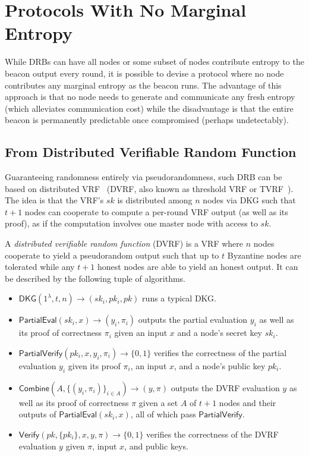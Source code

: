 \section{Protocols With No Marginal Entropy}
\label{section:dvrf}
While DRBs can have all nodes or some subset of nodes contribute entropy to the beacon output every round, it is possible to devise a protocol where no node contributes any marginal entropy as the beacon runs. The advantage of this approach is that no node needs to generate and communicate any fresh entropy (which alleviates communication cost) while the disadvantage is that the entire beacon is permanently predictable once compromised (perhaps undetectably).

\subsection{From Distributed Verifiable Random Function}
Guaranteeing randomness entirely via pseudorandomness, such DRB can be based on distributed VRF~\cite{hanke2018dfinity,galindo2020fully} (DVRF, also known as threshold VRF or TVRF~\cite{cascudomt}). The idea is that the VRF's $sk$ is distributed among $n$ nodes via DKG such that $t + 1$ nodes can cooperate to compute a per-round VRF output (as well as its proof), as if the computation involves one master node with access to $sk$.

\begin{definition}
A \textit{distributed verifiable random function} (DVRF) is a VRF where $n$ nodes cooperate to yield a pseudorandom output such that up to $t$ Byzantine nodes are tolerated while any $t + 1$ honest nodes are able to yield an honest output. It can be described by the following tuple of algorithms.
\begin{itemize}
\item $\mathsf{DKG}(1^\lambda, t, n) \rightarrow (sk_i, pk_i, pk)$ runs a typical DKG.
\item $\mathsf{PartialEval}(sk_i, x) \rightarrow (y_i, \pi_i)$ outputs the partial evaluation $y_i$ as well as its proof of correctness $\pi_i$ given an input $x$ and a node's secret key $sk_i$.
\item $\mathsf{PartialVerify}(pk_i, x, y_i, \pi_i) \rightarrow \{0, 1\}$ verifies the correctness of the partial evaluation $y_i$ given its proof $\pi_i$, an input $x$, and a node's public key $pk_i$.
\item $\mathsf{Combine}(A, \{(y_i, \pi_i)\}_{i \in A}) \rightarrow (y, \pi)$ outputs the DVRF evaluation $y$ as well as its proof of correctness $\pi$ given a set $A$ of $t + 1$ nodes and their outputs of $\mathsf{PartialEval}(sk_i, x)$, all of which pass $\mathsf{PartialVerify}$.
\item $\mathsf{Verify}(pk, \{pk_i\}, x, y, \pi) \rightarrow \{0, 1\}$ verifies the correctness of the DVRF evaluation $y$ given $\pi$, input $x$, and public keys.
\end{itemize}
\end{definition}

